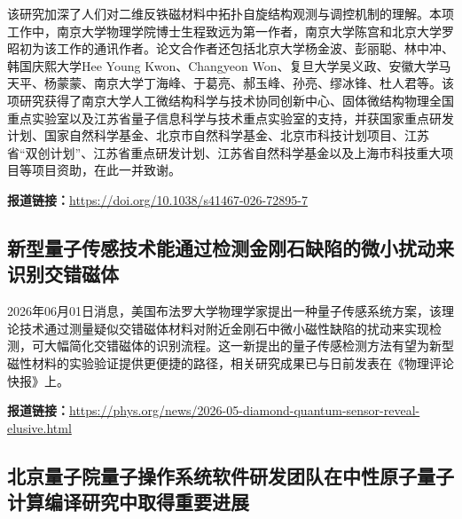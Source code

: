 \documentclass[12pt,a4paper]{ctexart}
\begin{document}
该研究加深了人们对二维反铁磁材料中拓扑自旋结构观测与调控机制的理解。本项工作中，南京大学物理学院博士生程致远为第一作者，南京大学陈宫和北京大学罗昭初为该工作的通讯作者。论文合作者还包括北京大学杨金波、彭丽聪、林中冲、韩国庆熙大学Hee Young Kwon、Changyeon Won、复旦大学吴义政、安徽大学马天平、杨蒙蒙、南京大学丁海峰、于葛亮、郝玉峰、孙亮、缪冰锋、杜人君等。该项研究获得了南京大学人工微结构科学与技术协同创新中心、固体微结构物理全国重点实验室以及江苏省量子信息科学与技术重点实验室的支持，并获国家重点研发计划、国家自然科学基金、北京市自然科学基金、北京市科技计划项目、江苏省“双创计划”、江苏省重点研发计划、江苏省自然科学基金以及上海市科技重大项目等项目资助，在此一并致谢。

\noindent\textbf{报道链接：}\url{https://doi.org/10.1038/s41467-026-72895-7}

\subsection{ 新型量子传感技术能通过检测金刚石缺陷的微小扰动来识别交错磁体 }

2026年06月01日消息，美国布法罗大学物理学家提出一种量子传感系统方案，该理论技术通过测量疑似交错磁体材料对附近金刚石中微小磁性缺陷的扰动来实现检测，可大幅简化交错磁体的识别流程。这一新提出的量子传感检测方法有望为新型磁性材料的实验验证提供更便捷的路径，相关研究成果已与日前发表在《物理评论快报》上。

\noindent\textbf{报道链接：}\url{https://phys.org/news/2026-05-diamond-quantum-sensor-reveal-elusive.html}

\subsection{ 北京量子院量子操作系统软件研发团队在中性原子量子计算编译研究中取得重要进展 }
\end{document}
